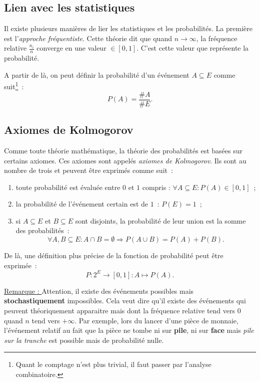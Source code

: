 \documentclass{article}
\begin{document}
	\subsection{Lien avec les statistiques}
		Il existe plusieurs manières de lier les statistiques et les probabilités. La première est l'\textit{approche fréquentiste}. Cette théorie dit que quand
		$n \to \infty$, la fréquence relative $\frac {n_i}n$ converge en une valeur $\in [0, 1]$. C'est cette valeur que représente la probabilité.

		A partir de là, on peut définir la probabilité d'un événement $A \subseteq E$ comme suit\footnote{Quant le comptage n'est plus trivial, il faut passer
		par l'analyse combinatoire.}~:
		\[P(A) = \frac {\#A}{\#E}.\]

	\subsection{Axiomes de Kolmogorov}
		Comme toute théorie mathématique, la théorie des probabilités est basées sur certains axiomes. Ces axiomes sont appelés \textit{axiomes de Kolmogorov}.
		Ils sont au nombre de trois et peuvent être exprimés comme suit~:
		\begin{enumerate}
			\item toute probabilité est évaluée entre $0$ et $1$ compris : $\forall A \subseteq E : P(A) \in [0, 1]$~;
			\item la probabilité de l'événement certain est de $1$~: $P(E) = 1$~;
			\item si $A \subseteq E$ et $B \subseteq E$ sont disjoints, la probabilité de leur union est la somme des probabilités~:
			\[\forall A, B \subseteq E : A \cap B = \emptyset \Rightarrow P(A \cup B) = P(A) + P(B).\]
		\end{enumerate}

		De là, une définition plus précise de la fonction de probabilité peut être exprimée~:
		\[P : 2^E \to [0, 1] : A \mapsto P(A).\]

		\underline{Remarque : } Attention, il existe des événements possibles mais \textbf{stochastiquement} impossibles. Cela veut dire qu'il existe des événements qui
		peuvent théoriquement apparaitre mais dont la fréquence relative tend vers $0$ quand $n$ tend vers $+\infty$. Par exemple, lors du lancer d'une pièce de monnaie,
		l'événement relatif au fait que la pièce ne tombe ni sur \textbf{pile}, ni sur \textbf{face} mais \textit{pile sur la tranche} est possible mais de probabilité
		nulle.
\end{document}
